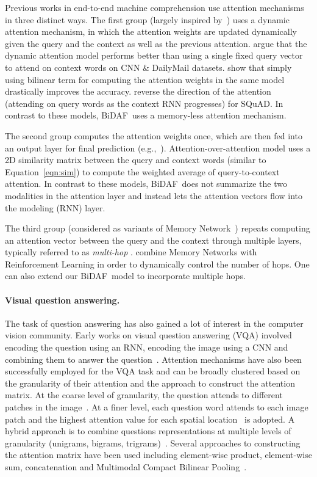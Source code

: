 \documentclass{article} \usepackage{iclr2017_conference,times}
\newcommand{\sysshort}{\mbox{\sc BiDAF}}
\begin{document}
Previous works in end-to-end machine comprehension use attention mechanisms in three distinct ways. 
The first group (largely inspired by~\cite{Bahdanau2014NeuralMT}) uses a dynamic attention mechanism, in which the attention weights are updated dynamically given the query and the context as well as the previous attention. 
\cite{Hermann2015TeachingMT} argue that the dynamic attention model performs better than using a single fixed query vector to attend on context words on CNN \& DailyMail datasets.
\cite{thorough} show that simply using bilinear term for computing the attention weights in the same model drastically improves the accuracy.
\cite{wang2016machine} reverse the direction of the attention (attending on query words as the context RNN progresses) for SQuAD. In contrast to these models, \sysshort\ uses a memory-less attention mechanism. 

The second group computes the attention weights once, which are then fed into an output layer for final prediction (e.g.,~\cite{kadlec2016text}).
Attention-over-attention model \citep{aoa} uses a 2D similarity matrix between the query and context words (similar to Equation~\ref{eqn:sim}) to compute the weighted average of query-to-context attention. In contrast to these models, \sysshort\ does not summarize the two modalities in the attention layer and instead lets the attention vectors flow into the modeling (RNN) layer. 

The third group (considered as variants of Memory Network~\citep{memnn}) repeats computing an attention vector between the query and the context through multiple layers, typically referred to as \emph{multi-hop} \citep{iterative,ga}. \cite{reasonet} combine Memory Networks with Reinforcement Learning in order to dynamically control the number of hops. One can also extend our \sysshort\ model to incorporate multiple hops.


\paragraph{Visual question answering.}
The task of question answering has also gained a lot of interest in the computer vision community. Early works on visual question answering (VQA) involved encoding the question using an RNN, encoding the image using a CNN and combining them to answer the question~\citep{antol2015vqa,Malinowski2015AskYN}. Attention mechanisms have also been successfully employed for the VQA task and can be broadly clustered based on the granularity of their attention and the approach to construct the attention matrix. At the coarse level of granularity, the question attends to different patches in the image~\citep{Zhu2015Visual7WGQ,xiong2016dynamic}. At a finer level, each question word attends to each image patch and the highest attention value for each spatial location~\citep{Xu2016AskAA} is adopted. A hybrid approach is to combine questions representations at multiple levels of granularity (unigrams, bigrams, trigrams)~\citep{yang2015stacked}. Several approaches to constructing the attention matrix have been used including element-wise product, element-wise sum, concatenation and Multimodal Compact Bilinear Pooling~\citep{fukui2016multimodal}.
\end{document}
